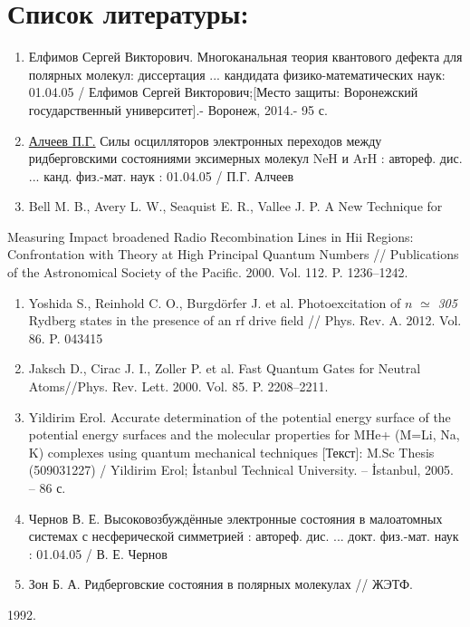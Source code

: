 \documentclass[a4paper]{article}
\newcounter{saveenum}
\newcommand\liststyleWWNumi{%
\renewcommand\theenumi{\arabic{enumi}}
\renewcommand\theenumii{\Roman{enumii}}
\renewcommand\theenumiii{\roman{enumiii}}
\renewcommand\theenumiv{\arabic{enumiv}}
\renewcommand\labelenumi{\theenumi.}
\renewcommand\labelenumii{\theenumii.}
\renewcommand\labelenumiii{\theenumiii.}
\renewcommand\labelenumiv{\theenumiv.}
}
\begin{document}
\clearpage\section[Список
литературы:]{Список
литературы:}
\hypertarget{RefHeading4709463868395}{}\liststyleWWNumi
\begin{enumerate}
\item Елфимов Сергей
Викторович. Многоканальная теория квантового дефекта для полярных молекул: диссертация ... кандидата физико-математических
наук: 01.04.05 / Елфимов
Сергей
Викторович;[Место
защиты: Воронежский государственный
университет].-
Воронеж, 2014.- 95 с.
\item
\href{http://xn--90ax2c.xn--p1ai/search/?f_field%5bauthorbook%5d=f/authorbook/%D0%B0%D0%BB%D1%87%D0%B5%D0%B5%D0%B2+%D0%BF.%D0%B3.}{Алчеев П.Г.} Силы осцилляторов электронных переходов между ридберговскими состояниями эксимерных молекул NeH и ArH : автореф. дис. ... канд. физ.-мат. наук : 01.04.05 / П.Г. Алчеев
\item \foreignlanguage{english}{Bell M. B., Avery L. W., Seaquist E. R., Vallee J. P. A New Technique for}
\end{enumerate}
\foreignlanguage{english}{Measuring Impact broadened Radio Recombination Lines in Hii Regions: Confrontation with Theory
at High Principal Quantum Numbers // Publications of the Astronomical Society of the Pacific. 2000. Vol. 112. P.
1236--1242.}

\liststyleWWNumi
\setcounter{saveenum}{\value{enumi}}
\begin{enumerate}
\setcounter{enumi}{\value{saveenum}}
\item \foreignlanguage{english}{Yoshida S., Reinhold C. O., Burgd\"orfer J. et al. Photoexcitation of }\newline
$n$\foreignlanguage{english}{
}\foreignlanguage{english}{\textit{${\simeq}$}}\foreignlanguage{english}{
}\foreignlanguage{english}{\textit{305}}\foreignlanguage{english}{ Rydberg states in the presence of an rf drive field
// Phys. Rev. A. 2012. Vol. 86. P. 043415}
\item \foreignlanguage{english}{Jaksch D., Cirac J. I., Zoller P. et al. Fast Quantum Gates for Neutral Atoms//Phys.
Rev. Lett. 2000. Vol. 85. P. 2208--2211.}
\item \foreignlanguage{english}{Yildirim Erol. Accurate determination of the potential energy surface of the potential
energy surfaces and the molecular properties for MHe+ (M=Li, Na, K) complexes using quantum mechanical techniques
[}Текст\foreignlanguage{english}{]: M.Sc Thesis (509031227) / Yildirim Erol; \.Istanbul
Technical University. -- \.Istanbul, 2005. -- 86 }с\foreignlanguage{english}{.}
\item Чернов В. Е.
Высоковозбуждённые электронные состояния в малоатомных системах с несферической симметрией : автореф. дис. ... докт.
физ.-мат. наук : 01.04.05 / В. Е.
Чернов
\item Зон Б. А.
Ридберговские состояния в полярных
молекулах // ЖЭТФ.
\end{enumerate}
\foreignlanguage{english}{1992. }
\end{document}
